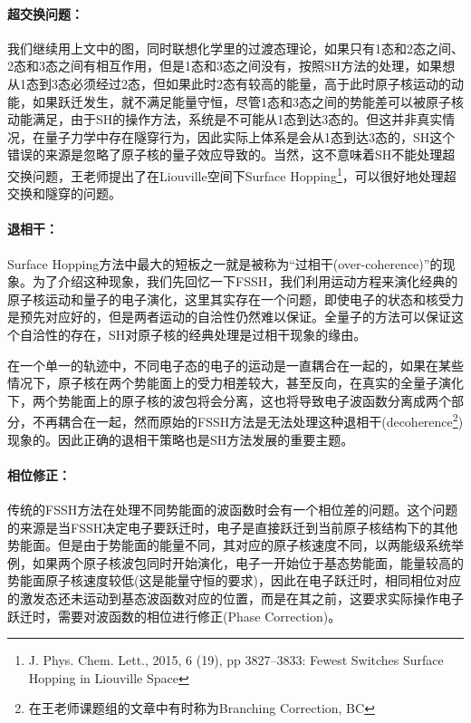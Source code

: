 \documentclass{article}
\numberwithin{equation}{section}
\begin{document}
        \paragraph{超交换问题：}我们继续用上文中的图，同时联想化学里的过渡态理论，如果只有1态和2态之间、2态和3态之间有相互作用，但是1态和3态之间没有，按照SH方法的处理，如果想从1态到3态必须经过2态，但如果此时2态有较高的能量，高于此时原子核运动的动能，如果跃迁发生，就不满足能量守恒，尽管1态和3态之间的势能差可以被原子核动能满足，由于SH的操作方法，系统是不可能从1态到达3态的。但这并非真实情况，在量子力学中存在隧穿行为，因此实际上体系是会从1态到达3态的，SH这个错误的来源是忽略了原子核的量子效应导致的。当然，这不意味着SH不能处理超交换问题，王老师提出了在Liouville空间下Surface Hopping\footnote{J. Phys. Chem. Lett., 2015, 6 (19), pp 3827–3833: Fewest Switches Surface Hopping in Liouville Space}，可以很好地处理超交换和隧穿的问题。

        \paragraph{退相干：}Surface Hopping方法中最大的短板之一就是被称为“过相干(over-coherence)”的现象。为了介绍这种现象，我们先回忆一下FSSH，我们利用运动方程来演化经典的原子核运动和量子的电子演化，这里其实存在一个问题，即使电子的状态和核受力是预先对应好的，但是两者运动的自洽性仍然难以保证。全量子的方法可以保证这个自洽性的存在，SH对原子核的经典处理是过相干现象的缘由。

        在一个单一的轨迹中，不同电子态的电子的运动是一直耦合在一起的，如果在某些情况下，原子核在两个势能面上的受力相差较大，甚至反向，在真实的全量子演化下，两个势能面上的原子核的波包将会分离，这也将导致电子波函数分离成两个部分，不再耦合在一起，然而原始的FSSH方法是无法处理这种退相干(decoherence\footnote{在王老师课题组的文章中有时称为Branching Correction, BC})现象的。因此正确的退相干策略也是SH方法发展的重要主题。
        
        \paragraph{相位修正：}传统的FSSH方法在处理不同势能面的波函数时会有一个相位差的问题。这个问题的来源是当FSSH决定电子要跃迁时，电子是直接跃迁到当前原子核结构下的其他势能面。但是由于势能面的能量不同，其对应的原子核速度不同，以两能级系统举例，如果两个原子核波包同时开始演化，电子一开始位于基态势能面，能量较高的势能面原子核速度较低(这是能量守恒的要求)，因此在电子跃迁时，相同相位对应的激发态还未运动到基态波函数对应的位置，而是在其之前，这要求实际操作电子跃迁时，需要对波函数的相位进行修正(Phase Correction)。
\end{document}
